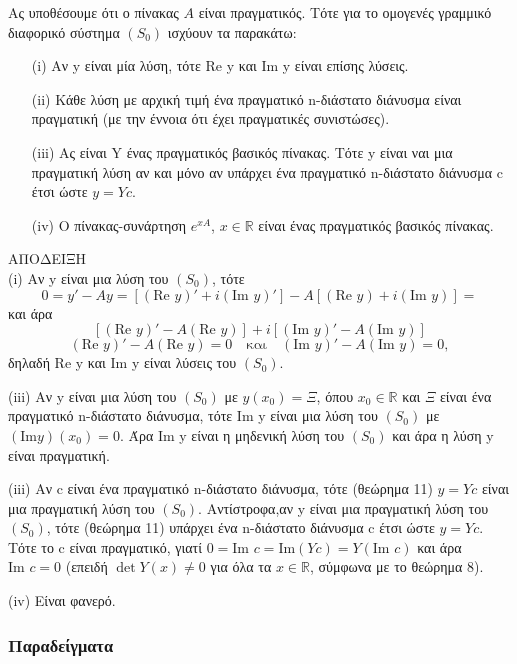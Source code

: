\documentclass[11pt,a4paper,twoside]{book}
\newcommand{\titlefont}[1]{{\fontfamily{maksf}\selectfont #1}}
\newcounter{thewrhma}[chapter]
\renewcommand{\thethewrhma}{\thechapter.\arabic{thewrhma}}
\newcommand{\thewr}{\refstepcounter{thewrhma}{\bf\titlefont{\textcolor{secondarycolor}{\large Θεώρημα\hspace{2mm}\thethewrhma}}}\hspace{1mm}}{}
\newenvironment{Thewrhma}[1]
{\begin{tcolorbox}[title=\thewr\ \ :\ \  {\textcolor{black}{\bf{\large\titlefont{#1}}}},
breakable,
enhanced standard,
titlerule=-.2pt,
toprule=0pt, 
rightrule=0pt, 
bottomrule=0pt,
colback=white,
left=2mm,
top=1mm,
bottom=0mm,
boxrule=0pt,
colframe=white,
borderline west={1.5mm}{0pt}{secondarycolor},
leftrule=2mm,
sharp corners,
coltitle=secondarycolor]}
{\end{tcolorbox}}
\begin{document}
\begin{Thewrhma}{18}
Ας υποθέσουμε ότι ο πίνακας $Α$ είναι πραγματικός. Τότε για το ομογενές γραμμικό διαφορικό σύστημα $(S_0)$ ισχύουν τα παρακάτω:
\begin{enumerate}
    \item[(i)] Αν y είναι μία λύση, τότε Re y και Im y είναι επίσης λύσεις.
    \item[(ii)] Κάθε λύση με αρχική τιμή ένα πραγματικό n-διάστατο διάνυσμα είναι πραγματική (με την έννοια ότι έχει πραγματικές συνιστώσες).

    \item[(iii)] Ας είναι Y ένας πραγματικός βασικός πίνακας. Τότε y είναι ναι μια πραγματική λύση αν και μόνο αν υπάρχει ένα πραγματικό n-διάστατο διάνυσμα c έτσι ώστε $y = Yc$.
    \item[(iv)] Ο πίνακας-συνάρτηση $e^{xA}$, $x \in \mathbb{R}$ είναι ένας πραγματικός βασικός πίνακας.
\end{enumerate}
\end{Thewrhma}
ΑΠΟΔΕΙΞΗ\\
(i) Αν y είναι μια λύση του $(S_0)$, τότε
\[
0 = y' - Ay = [(\text{Re } y)' + i(\text{Im } y)'] - A[(\text{Re } y) + i(\text{Im } y)] = 
\]
και άρα
\[
[(\text{Re } y)' - A(\text{Re } y)] + i[(\text{Im } y)' - A(\text{Im } y)]
\]
\[
(\text{Re } y)' - A(\text{Re } y) = 0 \quad \text{και} \quad (\text{Im } y)' - A(\text{Im } y) = 0,
\]
δηλαδή Re y και Im y είναι λύσεις του $(S_0)$.

(iii) Αν y είναι μια λύση του $(S_0)$ με $y(x_0) = \Xi$, όπου $x_0 \in \mathbb{R}$ και $\Xi$ είναι ένα πραγματικό n-διάστατο διάνυσμα, τότε Im y είναι μια λύση του $(S_0)$ με $(\text{Im} y)(x_0) = 0$. Άρα Im y είναι η μηδενική λύση του $(S_0)$ και άρα η λύση y είναι πραγματική.

(iii) Αν c είναι ένα πραγματικό n-διάστατο διάνυσμα, τότε (θεώρημα 11) $y=Yc$ είναι μια πραγματική λύση του $(S_0)$. Αντίστροφα,αν y είναι μια πραγματική λύση του $(S_0)$, τότε (θεώρημα 11) υπάρχει ένα n-διάστατο διάνυσμα c έτσι ώστε $y=Yc$. Τότε το c είναι πραγματικό, γιατί $0 = \text{Im } c = \text{Im}(Yc) = Y(\text{Im } c)$ και άρα $\text{Im } c = 0$ (επειδή $\det Y(x) \neq 0$ για όλα τα $x \in \mathbb{R}$, σύμφωνα με το θεώρημα 8).

(iv) Είναι φανερό.
\subsubsection{Παραδείγματα}
\end{document}
